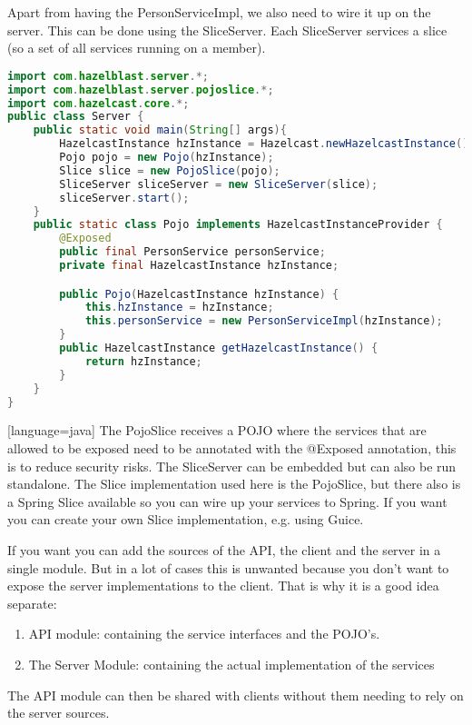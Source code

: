 Apart from having the PersonServiceImpl, we also need to wire it up on the server. This can be done using the SliceServer. Each SliceServer services a slice (so a set of all services running on a member).
\begin{lstlisting}[language=java]
import com.hazelblast.server.*;
import com.hazelblast.server.pojoslice.*;
import com.hazelcast.core.*;
public class Server {
    public static void main(String[] args){
        HazelcastInstance hzInstance = Hazelcast.newHazelcastInstance();
        Pojo pojo = new Pojo(hzInstance);
        Slice slice = new PojoSlice(pojo);
        SliceServer sliceServer = new SliceServer(slice);
        sliceServer.start();
    }
    public static class Pojo implements HazelcastInstanceProvider {
        @Exposed
        public final PersonService personService;
        private final HazelcastInstance hzInstance;

        public Pojo(HazelcastInstance hzInstance) {
            this.hzInstance = hzInstance;
            this.personService = new PersonServiceImpl(hzInstance);
        }
        public HazelcastInstance getHazelcastInstance() {
            return hzInstance;
        }
    }
}
\end{lstlisting}[language=java]
The PojoSlice receives a POJO where the services that are allowed to be exposed need to be annotated with the @Exposed annotation, this is to reduce security risks. The SliceServer can be embedded but can also be run standalone. The Slice implementation used here is the PojoSlice, but there also is a Spring Slice available so you can wire up your services to Spring. If you want you can create your own Slice implementation, e.g. using Guice.

If you want you can add the sources of the API, the client and the server in a single module. But in a lot of cases this is unwanted because you don't want to expose the server implementations to the client. That is why it is a good idea separate:
\begin{enumerate}
\item API module: containing the service interfaces and the POJO's.
\item The Server Module: containing the actual implementation of the services
\end{enumerate}
The API module can then be shared with clients without them needing to rely on the server sources.

